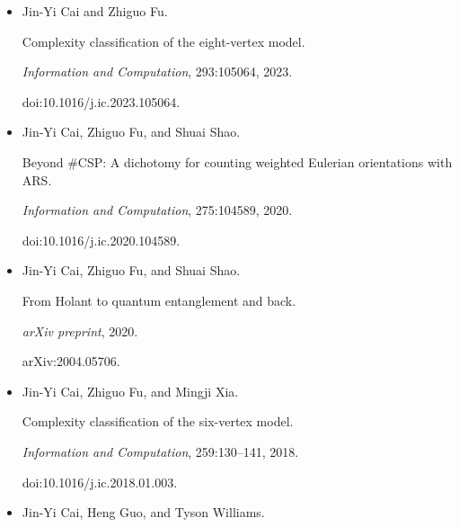 \documentclass[10pt,a4paper]{article}
\begin{document}
\begin{itemize}
Jin-Yi Cai and Zhiguo Fu.


Holographic algorithm with matchgates is universal for planar \#CSP
over Boolean domain.


\emph{SIAM Journal on Computing}, 51(2):STOC17–50, 2019.





\item[] 
[7]

Jin-Yi Cai and Zhiguo Fu.


Complexity classification of the eight-vertex model.


\emph{Information and Computation}, 293:105064, 2023.


doi:10.1016/j.ic.2023.105064.





\item[] 
[8]

Jin-Yi Cai, Zhiguo Fu, and Shuai Shao.


Beyond \#CSP: A dichotomy for counting weighted Eulerian
orientations with ARS.


\emph{Information and Computation}, 275:104589, 2020.


doi:10.1016/j.ic.2020.104589.





\item[] 
[9]

Jin-Yi Cai, Zhiguo Fu, and Shuai Shao.


From Holant to quantum entanglement and back.


\emph{arXiv preprint}, 2020.


arXiv:2004.05706.





\item[] 
[10]

Jin-Yi Cai, Zhiguo Fu, and Mingji Xia.


Complexity classification of the six-vertex model.


\emph{Information and Computation}, 259:130–141, 2018.


doi:10.1016/j.ic.2018.01.003.





\item[] 
[11]

Jin-Yi Cai, Heng Guo, and Tyson Williams.



\end{itemize}
\end{document}

